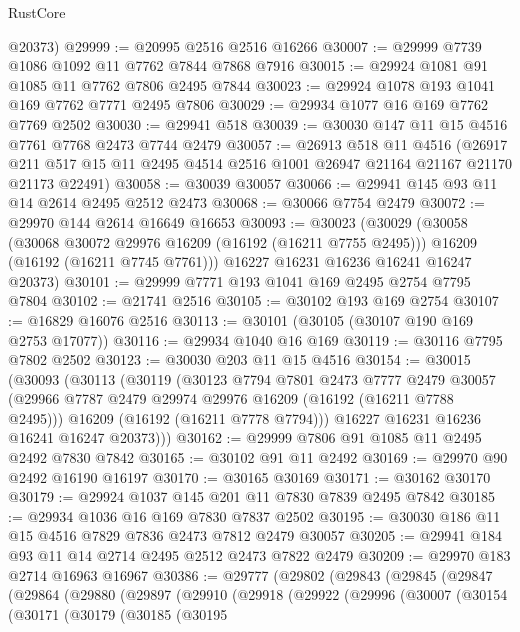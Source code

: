 \begin{lexlean}{RustCore}
\begin{coremodule}
      @20373)
@29999 := @20995 @2516 @2516 @16266
@30007 := @29999 @7739 @1086 @1092 @11 @7762 @7844 @7868 @7916
@30015 := @29924 @1081 @91 @1085 @11 @7762 @7806 @2495 @7844
@30023 := @29924 @1078 @193 @1041 @169 @7762 @7771 @2495 @7806
@30029 := @29934 @1077 @16 @169 @7762 @7769 @2502
@30030 := @29941 @518
@30039 := @30030 @147 @11 @15 @4516 @7761 @7768 @2473 @7744 @2479
@30057 := @26913
    @518
    @11
    @4516
    (@26917 @211 @517 @15 @11 @2495 @4514 @2516 @1001 @26947 @21164 @21167 @21170 @21173 @22491)
@30058 := @30039 @30057
@30066 := @29941 @145 @93 @11 @14 @2614 @2495 @2512 @2473
@30068 := @30066 @7754 @2479
@30072 := @29970 @144 @2614 @16649 @16653
@30093 := @30023
    (@30029
      (@30058
        (@30068 @30072 @29976 @16209 (@16192 (@16211 @7755 @2495)))
        @16209
        (@16192 (@16211 @7745 @7761)))
      @16227
      @16231
      @16236
      @16241
      @16247
      @20373)
@30101 := @29999 @7771 @193 @1041 @169 @2495 @2754 @7795 @7804
@30102 := @21741 @2516
@30105 := @30102 @193 @169 @2754
@30107 := @16829 @16076 @2516
@30113 := @30101 (@30105 (@30107 @190 @169 @2753 @17077))
@30116 := @29934 @1040 @16 @169
@30119 := @30116 @7795 @7802 @2502
@30123 := @30030 @203 @11 @15 @4516
@30154 := @30015
    (@30093
      (@30113
        (@30119
          (@30123
            @7794
            @7801
            @2473
            @7777
            @2479
            @30057
            (@29966 @7787 @2479 @29974 @29976 @16209 (@16192 (@16211 @7788 @2495)))
            @16209
            (@16192 (@16211 @7778 @7794)))
          @16227
          @16231
          @16236
          @16241
          @16247
          @20373)))
@30162 := @29999 @7806 @91 @1085 @11 @2495 @2492 @7830 @7842
@30165 := @30102 @91 @11 @2492
@30169 := @29970 @90 @2492 @16190 @16197
@30170 := @30165 @30169
@30171 := @30162 @30170
@30179 := @29924 @1037 @145 @201 @11 @7830 @7839 @2495 @7842
@30185 := @29934 @1036 @16 @169 @7830 @7837 @2502
@30195 := @30030 @186 @11 @15 @4516 @7829 @7836 @2473 @7812 @2479 @30057
@30205 := @29941 @184 @93 @11 @14 @2714 @2495 @2512 @2473 @7822 @2479
@30209 := @29970 @183 @2714 @16963 @16967
@30386 := @29777
    (@29802
      (@29843
        (@29845
          (@29847
            (@29864
              (@29880
                (@29897
                  (@29910
                    (@29918
                      (@29922
                        (@29996
                          (@30007
                            (@30154
                              (@30171
                                (@30179
                                  (@30185
                                    (@30195

\end{coremodule}
\end{lexlean}
